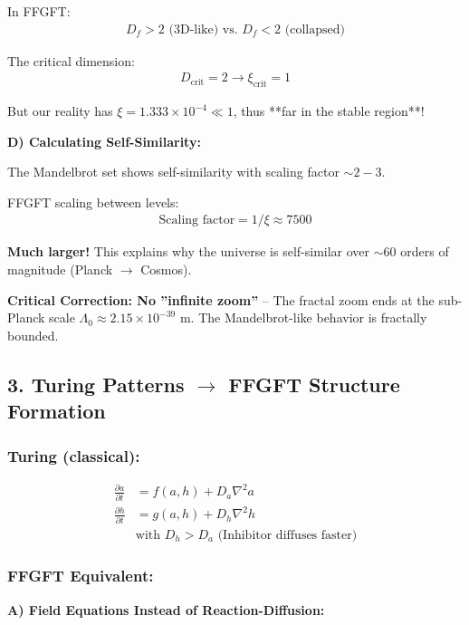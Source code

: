 	In FFGFT:
	\begin{align*}
		D_f > 2 \text{ (3D-like) vs. } D_f < 2 \text{ (collapsed)}
	\end{align*}
	
	The critical dimension:
	\begin{align*}
		D_{\text{crit}} = 2 \rightarrow \xi_{\text{crit}} = 1
	\end{align*}
	
	But our reality has $\xi = 1.333 \times 10^{-4} \ll 1$, thus **far in the stable region**!
	
	\textbf{D) Calculating Self-Similarity:}
	
	The Mandelbrot set shows self-similarity with scaling factor $\sim 2-3$.
	
	FFGFT scaling between levels:
	\begin{align*}
		\text{Scaling factor} = 1/\xi \approx 7500
	\end{align*}
	
	\textbf{Much larger!} This explains why the universe is self-similar over $\sim 60$ orders of magnitude (Planck $\to$ Cosmos).
	
	\textbf{Critical Correction: No ''infinite zoom''} – The fractal zoom ends at the sub-Planck scale $\Lambda_0 \approx 2.15 \times 10^{-39}$ m. The Mandelbrot-like behavior is fractally bounded.
	
	\subsection*{3. Turing Patterns $\rightarrow$ FFGFT Structure Formation}
	
	\subsubsection*{Turing (classical):}
	\begin{align*}
		\frac{\partial a}{\partial t} &= f(a,h) + D_a \nabla^2 a \\
		\frac{\partial h}{\partial t} &= g(a,h) + D_h \nabla^2 h \\
		&\text{with } D_h > D_a \text{ (Inhibitor diffuses faster)}
	\end{align*}
	
	\subsubsection*{FFGFT Equivalent:}
	
	\textbf{A) Field Equations Instead of Reaction-Diffusion:}
	
